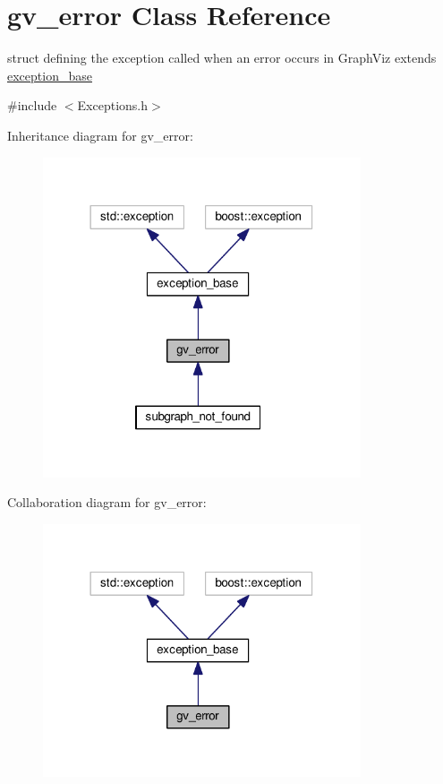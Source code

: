 \hypertarget{structgv__error}{\section{gv\+\_\+error Class Reference}
\label{structgv__error}
}


struct defining the exception called when an error occurs in Graph\+Viz extends \hyperlink{structexception__base}{exception\+\_\+base}  




{\ttfamily \#include $<$Exceptions.\+h$>$}



Inheritance diagram for gv\+\_\+error\+:\nopagebreak
\begin{figure}[H]
\begin{center}
\leavevmode
\includegraphics[width=266pt]{structgv__error__inherit__graph}
\end{center}
\end{figure}


Collaboration diagram for gv\+\_\+error\+:\nopagebreak
\begin{figure}[H]
\begin{center}
\leavevmode
\includegraphics[width=266pt]{structgv__error__coll__graph}
\end{center}
\end{figure}


